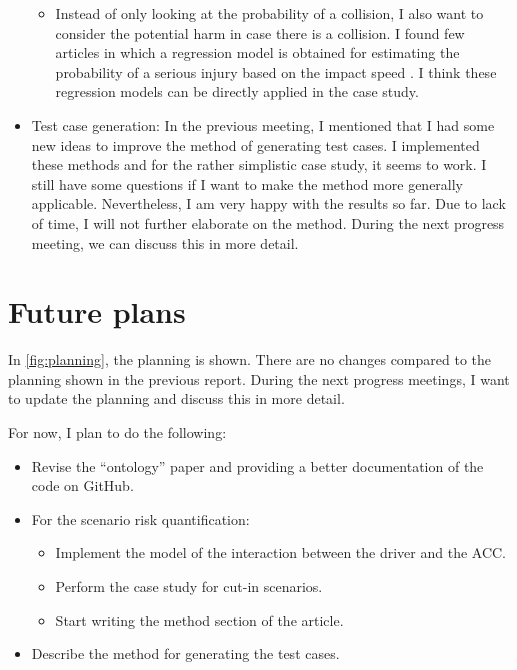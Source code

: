 \documentclass[10pt,final,a4paper,oneside,onecolumn]{article}
\begin{document}
\begin{itemize}
\begin{itemize}
		\item Instead of only looking at the probability of a collision, I also want to consider the potential harm in case there is a collision. I found few articles in which a regression model is obtained for estimating the probability of a serious injury based on the impact speed \autocite{augenstein2003methodology, yoshida2016development}. I think these regression models can be directly applied in the case study.
	\end{itemize}

	\item Test case generation: In the previous meeting, I mentioned that I had some new ideas to improve the method of generating test cases. I implemented these methods and for the rather simplistic case study, it seems to work. I still have some questions if I want to make the method more generally applicable. Nevertheless, I am very happy with the results so far. Due to lack of time, I will not further elaborate on the method. During the next progress meeting, we can discuss this in more detail.
\end{itemize}

\section{Future plans}

In \cref{fig:planning}, the planning is shown. There are no changes compared to the planning shown in the previous report. During the next progress meetings, I want to update the planning and discuss this in more detail.

For now, I plan to do the following:
\begin{itemize}
	\item Revise the ``ontology'' paper and providing a better documentation of the code on GitHub.
	\item For the scenario risk quantification:
	\begin{itemize}
		\item Implement the model of the interaction between the driver and the ACC.
		\item Perform the case study for cut-in scenarios.
		\item Start writing the method section of the article.
	\end{itemize}
	\item Describe the method for generating the test cases.
\end{itemize}
\end{document}
